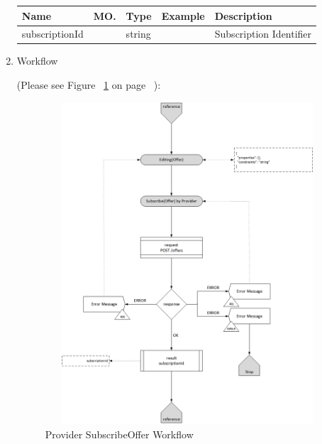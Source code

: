 \begin{enumerate}
\begin{table}[H]
\footnotesize

\begin{center}
\begin{tabular}{|p{3cm}|l|p{3cm}|p{3cm}|p{4cm}|} 
\hline
\rowcolor{lightgray}	Name	& MO.	& Type	& Example & 	Description \\
\hline

subscriptionId	&	& 	string	&		&	Subscription Identifier \\ 

\hline

\end{tabular}
\end{center}
\end{table}

\item Workflow

(Please see Figure ~\ref{fig:SubsOffer} on page ~\pageref{fig:SubsOffer}):

\begin{figure}[H]
    \centering
    \includegraphics[width=12cm,height=12cm,angle=0]{./diag/Workflow/Market/SubscribeOffer-P-Workflow.png}
    \caption{Provider SubscribeOffer Workflow}
	\label{fig:SubsOffer}
\end{figure}

\end{enumerate}

\newpage

